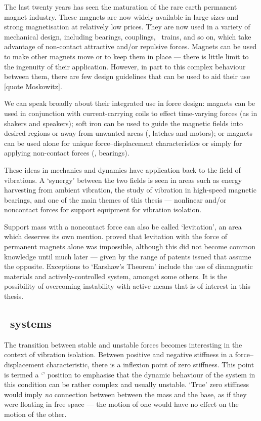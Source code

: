 The last twenty years has seen the maturation of the rare earth permanent
magnet industry. These magnets are now widely available in large sizes and
strong magnetisation at relatively low prices. They are now used in a variety
of mechanical design, including bearings, couplings, \maglev\ trains, and so
on, which take advantage of non-contact attractive and/or repulsive forces.
Magnets can be used to make other magnets move or to keep them in place —
there is little limit to the ingenuity of their application. However, in part
to this complex behaviour between them, there are few design guidelines that
can be used to aid their use [quote Moskowitz].

We can speak broadly about their integrated use in force design: magnets can
be used in conjunction with current-carrying coils to effect time-varying
forces (as in shakers and speakers); soft iron can be used to guide the
magnetic fields into desired regions or away from unwanted areas (\eg, latches
and motors); or magnets can be used alone for unique force--displacement
characteristics or simply for applying non-contact forces (\eg, bearings).

These ideas in mechanics and dynamics have application back to the field of
vibrations. A `synergy' between the two fields is seen in areas such as energy
harvesting from ambient vibration, the study of vibration in high-speed
magnetic bearings, and one of the main themes of this thesis — nonlinear
and/or noncontact forces for support equipment for vibration isolation.

Support mass with a noncontact force can also be called `levitation', an area
which deserves its own mention. \textcite{earnshaw1842} proved that levitation
with the force of permanent magnets alone was impossible, although this did
not become common knowledge  until much later — given
by the range of patents issued that assume the opposite. Exceptions to
`Earshaw's Theorem' include the use of diamagnetic materials and
actively-controlled system, amongst some others. It is the possibility of
overcoming instability with active means that is of interest in this thesis.

\subsection{\QZS\ systems}

The transition between stable and unstable forces becomes interesting in the
context of vibration isolation. Between positive and negative stiffness in a
force--displacement characteristic, there is a inflexion point of zero
stiffness. This point is termed a `\qzs' position to emphasise that the
dynamic behaviour of the system in this condition can be rather complex and
usually unstable. `True' zero stiffness would imply \emph{no} connection
between between the mass and the base, as if they were floating in free space
— the motion of one would have no effect on the motion of the other.

